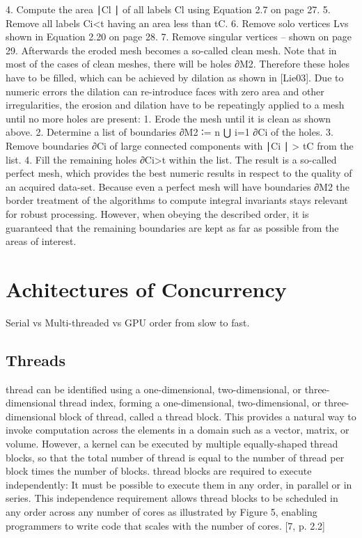 4. Compute the area ∣Cl ∣ of all labels Cl using Equation 2.7 on page 27.
5. Remove all labels Ci<t having an area less than tC.
6. Remove solo vertices Lvs shown in Equation 2.20 on page 28.
7. Remove singular vertices – shown on page 29.
Afterwards the eroded mesh becomes a so-called clean mesh. Note that in most of 
the cases of clean meshes, there will be holes ∂M2. Therefore these holes have 
to be filled, which can be achieved by dilation as shown in [Lie03]. Due to 
numeric errors the dilation can re-introduce faces with zero area and other 
irregularities, the erosion and dilation have to be repeatingly applied to a mesh 
until no more holes are present:
1. Erode the mesh until it is clean as shown above.
2. Determine a list of boundaries ∂M2 ∶= n ⋃ i=1 ∂Ci of the holes.
3. Remove boundaries ∂Ci of large connected components with ∣Ci ∣ > tC from the 
list.
4. Fill the remaining holes ∂Ci>t within the list.
The result is a so-called perfect mesh, which provides the best numeric results 
in respect to the quality of an acquired data-set. Because even a perfect mesh 
will have boundaries ∂M2 the border treatment of the algorithms to compute 
integral invariants stays relevant for robust processing. However, when obeying 
the described order, it is guaranteed that the remaining boundaries are kept as 
far as possible from the areas of interest.~\cite[p.~120]{Mara12}
%
%
%
\section{Achitectures of Concurrency}
Serial vs Multi-threaded vs GPU order from slow to fast.~\cite[p.~00]{todoCitation}
\todoCitation
%

\subsection{Threads}
thread can be identified using a one-dimensional, two-dimensional, or three-
dimensional thread index, forming a one-dimensional, two-dimensional, or three-
dimensional block of thread, called a thread block. This provides a natural way
to invoke computation across the elements in a domain such as a vector, matrix,
or volume. However, a kernel can be executed by multiple equally-shaped thread
blocks, so that the total number of thread is equal to the number of thread
per block times the number of blocks. thread blocks are required to execute
independently: It must be possible to execute them in any order, in parallel or
in series. This independence requirement allows thread blocks to be scheduled
in any order across any number of cores as illustrated by Figure 5, enabling
programmers to write code that scales with the number of cores. [7, p. 2.2]
%
%
%
